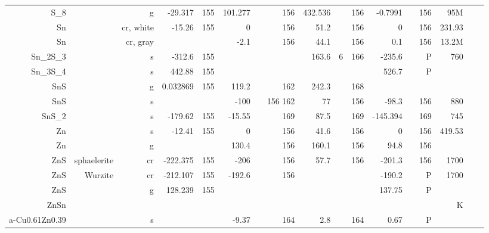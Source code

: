 \begin{table}[htbp]
\begin{adjustbox}{width=1\textwidth}
\begin{tabular}{rrrrrrrrrrrrrrrrr}
    S\_8  &       & g     & -29.317 & 155   & 101.277 &       & 156   & 432.536 &       & 156   & -0.7991 &       & 156   & 95M   &       &  \\
    Sn    &       & cr, white & -15.26 & 155   & 0     &       & 156   & 51.2  &       & 156   & 0     &       & 156   & 231.93 &       &  \\
    Sn    &       & cr, gray &       &       & -2.1  &       & 156   & 44.1  &       & 156   & 0.1   &       & 156   & 13.2M &       &  \\
    Sn\_2S\_3 &       & s     & -312.6 & 155   &       &       &       & 163.6 & 6     & 166   & -235.6 &       & P     & 760   &       &  \\
    Sn\_3S\_4 &       & s     & 442.88 & 155   &       &       &       &       &       &       & 526.7 &       & P     &       &       &  \\
    SnS   &       & g     & 0.032869 & 155   & 119.2 &       & 162   & 242.3 &       & 168   &       &       &       &       &       &  \\
    SnS   &       & s     &       &       & -100  &       & 156 162 & 77    &       & 156   & -98.3 &       & 156   & 880   &       &  \\
    SnS\_2 &       & s     & -179.62 & 155   & -15.55 &       & 169   & 87.5  &       & 169   & -145.394 &       & 169   & 745   &       &  \\
    Zn    &       & s     & -12.41 & 155   & 0     &       & 156   & 41.6  &       & 156   & 0     &       & 156   & 419.53 &       &  \\
    Zn    &       & g     &       &       & 130.4 &       & 156   & 160.1 &       & 156   & 94.8  &       & 156   &       &       &  \\
    ZnS   & sphaelerite & cr    & -222.375 & 155   & -206  &       & 156   & 57.7  &       & 156   & -201.3 &       & 156   & 1700  &       &  \\
    ZnS   & Wurzite & cr    & -212.107 & 155   & -192.6 &       & 156   &       &       &       & -190.2 &       & P     & 1700  &       &  \\
    ZnS   &       & g     & 128.239 & 155   &       &       &       &       &       &       & 137.75 &       & P     &       &       &  \\
    ZnSn  &       &       &       &       &       &       &       &       &       &       &       &       &       & K     &       &  \\
    a-Cu0.61Zn0.39 &       & s     &       &       & -9.37 &       & 164   & 2.8   &       & 164   & 0.67  &       & P     &       &       &  \\

\end{tabular}
\end{adjustbox}
\end{table}
